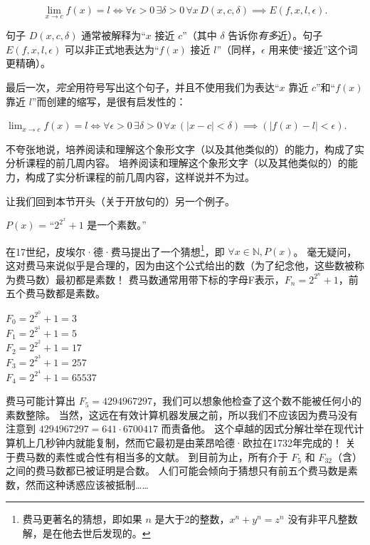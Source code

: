 \[ \lim_{x\rightarrow c}f(x) = l \iff \forall \epsilon>0 \, \exists \delta>0 \, \forall x \, D(x,c,\delta) \implies E(f,x,l,\epsilon).
\]

句子 $D(x,c,\delta)$ 通常被解释为“$x$ 接近 $c$”（其中 $\delta$ 告诉你{\em 有多}近）。句子 $E(f,x,l,\epsilon)$ 可以非正式地表达为“$f(x)$ 接近 $l$”（同样，$\epsilon$ 用来使“接近”这个词更精确）。

最后一次，{\em 完全}用符号写出这个句子，并且不使用我们为表达“$x$ 靠近 $c$”和“$f(x)$ 靠近 $l$”而创建的缩写，是很有启发性的：

$\displaystyle \lim_{x\rightarrow c}f(x) = l \iff \forall \epsilon>0 \, \exists 
\delta>0 \, \forall x \, (|x-c| < \delta) \implies (|f(x)-l| < \epsilon) $.

不夸张地说，培养阅读和理解这个象形文字（以及其他类似的）的能力，构成了实分析课程的前几周内容。
培养阅读和理解这个象形文字（以及其他类似的）的能力，构成了实分析课程的前几周内容，这样说并不为过。

让我们回到本节开头（关于开放句的）另一个例子。

$P(x)$ = “$2^{2^x}+1$ 是一个素数。”

在17世纪，皮埃尔·德·费马提出了一个猜想\footnote{费马更著名的猜想，即如果 $n$ 是大于2的整数，$x^n+y^n=z^n$ 没有非平凡整数解，是在他去世后发现的。}，即 $\forall x \in {\mathbb N}, P(x)$。
毫无疑问，这对费马来说似乎是合理的，因为由这个公式给出的数（为了纪念他，这些数被称为费马数）最初都是素数！
费马数通常用带下标的字母F表示，$F_n = 2^{2^n}+1$，前五个费马数都是素数。

\begin{center}
$\displaystyle F_0 = 2^{2^0}+1 = 3$\\
$\displaystyle F_1 = 2^{2^1}+1 = 5$\\
$\displaystyle F_2 = 2^{2^2}+1 = 17$\\
$\displaystyle F_3 = 2^{2^3}+1 = 257$\\
$\displaystyle F_4 = 2^{2^4}+1 = 65537$\\
\end{center}

费马可能计算出 $F_5=4294967297$，我们可以想象他检查了这个数不能被任何小的素数整除。
当然，这远在有效计算机器发展之前，所以我们不应该因为费马没有注意到 $4294967297 = 641 \cdot 6700417$ 而责备他。
这个卓越的因式分解壮举在现代计算机上几秒钟内就能复制，然而它最初是由莱昂哈德·欧拉在1732年完成的！
关于费马数的素性或合性有相当多的文献。
到目前为止，所有介于 $F_5$ 和 $F_{32}$（含）之间的费马数都已被证明是合数。
人们可能会倾向于猜想只有前五个费马数是素数，然而这种诱惑应该被抵制……

